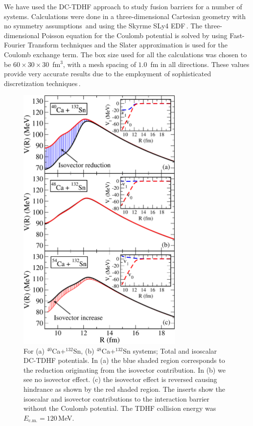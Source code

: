 We have used the DC-TDHF approach to study fusion barriers for a number of systems.
Calculations were done in a three-dimensional
Cartesian geometry with no symmetry assumptions\,\citep{umar2006c} and using the
Skyrme SLy4 EDF\,\citep{chabanat1998a}.
The three-dimensional Poisson equation for the Coulomb potential
is solved by using Fast-Fourier Transform techniques
and the Slater approximation is used for the Coulomb exchange term.
The box size used for all the calculations
was chosen to be $60\times 30\times 30$~fm$^3$, with a mesh spacing of
$1.0$~fm in all directions. These values provide very accurate
results due to the employment of sophisticated discretization
techniques\,\citep{umar1991a}.
\begin{figure}
	\centering
	\includegraphics*[width=0.73\textwidth]{../Figures/Isospin/V_Ca_Sn_stack.pdf}
	\caption{For     (a) $^{40}$Ca+$^{132}$Sn,
		(b) $^{48}$Ca+$^{132}$Sn
		systems;
		Total and isoscalar DC-TDHF potentials. In (a) the blue shaded region
		corresponds to the reduction originating from the isovector contribution.
		In (b) we see no isovector effect. (c) the isovector effect is reversed
		causing hindrance as shown by the red shaded region.
		The inserts show the isoscalar and isovector contributions to the interaction barrier without the Coulomb potential.
		The TDHF collision energy was $E_\mathrm{c.m.}=120$\,MeV.}
	\label{fig:CaSn_1}
\end{figure}
